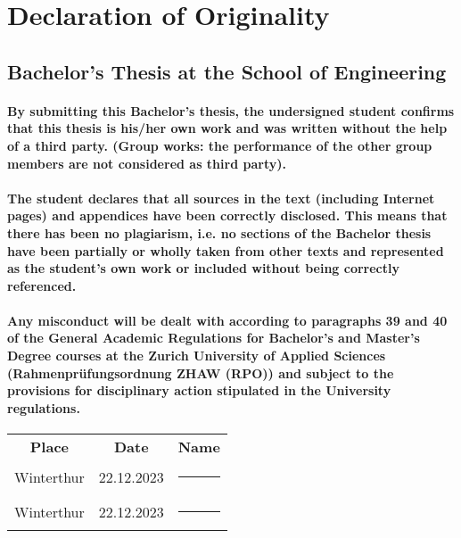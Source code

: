 
\section*{Declaration of Originality}

\subsection*{Bachelor’s Thesis at the School of Engineering}

\paragraph{By submitting this Bachelor’s thesis, the undersigned student confirms that this thesis is his/her own work and was written without the help of a third party. (Group works: the performance of the other group members are not considered as third party).}

\paragraph{The student declares that all sources in the text (including Internet pages) and appendices have been correctly disclosed. This means that there has been no plagiarism, i.e. no sections of the Bachelor thesis have been partially or wholly taken from other texts and represented as the student’s own work or included without being correctly referenced.}

\paragraph{Any misconduct will be dealt with according to paragraphs 39 and 40 of the General Academic Regulations for Bachelor’s and Master’s Degree courses at the Zurich University of Applied Sciences (Rahmenprüfungsordnung ZHAW (RPO)) and subject to the provisions for disciplinary action stipulated in the University regulations.}

\begin{table}[b]
    \centering
    \begin{tabular}{ccc}
        \textbf{Place} &  \textbf{Date} & \textbf{Name} \\
        Winterthur & 22.12.2023 & \rule{5cm}{0.2mm} \\
        Winterthur & 22.12.2023 & \rule{5cm}{0.2mm} \\
    \end{tabular}
\end{table}
